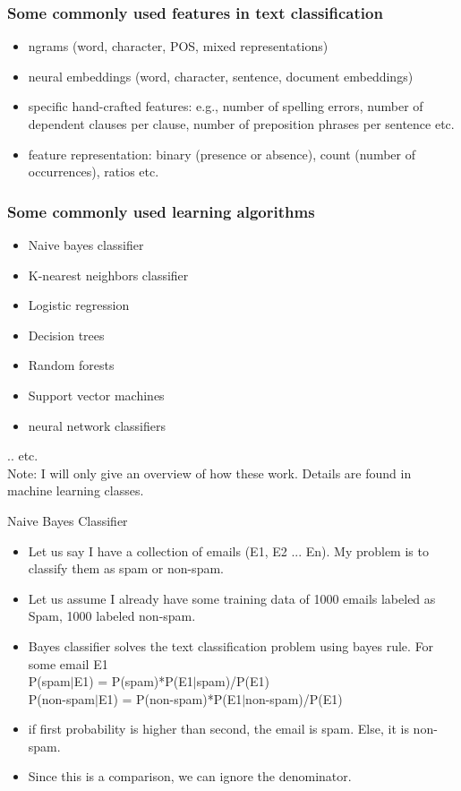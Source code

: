 \documentclass{beamer}
\begin{document}
\begin{frame}
\frametitle{Some commonly used features in text classification}
\begin{itemize}
\item ngrams (word, character, POS, mixed representations)
\item neural embeddings (word, character, sentence, document embeddings)
\item specific hand-crafted features: e.g., number of spelling errors, number of dependent clauses per clause, number of preposition phrases per sentence etc.
\item feature representation: binary (presence or absence), count (number of occurrences), ratios etc.
\end{itemize}
\end{frame}

\begin{frame}
\frametitle{Some commonly used learning algorithms}
\begin{itemize}
\item Naive bayes classifier
\item K-nearest neighbors classifier
\item Logistic regression
\item Decision trees
\item Random forests
\item Support vector machines
\item neural network classifiers
\end{itemize}
.. etc. \\ Note: I will only give an overview of how these work. Details are found in machine learning classes.
\end{frame}

\begin{frame}{Naive Bayes Classifier}
\begin{itemize}
\item Let us say I have a collection of emails (E1, E2 ... En). My problem is to classify them as spam or non-spam.
\item Let us assume I already have some training data of 1000 emails labeled as Spam, 1000 labeled non-spam.
\item Bayes classifier solves the text classification problem using bayes rule. For some email E1\\
P(spam$|$E1) = P(spam)*P(E1$|$spam)/P(E1) \\
P(non-spam$|$E1) = P(non-spam)*P(E1$|$non-spam)/P(E1) 
\item if first probability is higher than second, the email is spam. Else, it is non-spam.
\item Since this is a comparison, we can ignore the denominator.
\end{itemize}
\end{frame}
    
\end{document}
